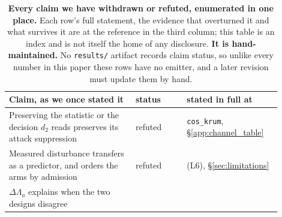 \documentclass{article}
\begin{document}
\begin{table}[t]
\caption{\textbf{Every claim we have withdrawn or refuted, enumerated in one place.} Each row's full
statement, the evidence that overturned it and what survives it are at the reference in the third
column; this table is an index and is not itself the home of any disclosure. \textbf{It is
hand-maintained.} No \texttt{results/} artifact records claim status, so unlike every number in this
paper these rows have no emitter, and a later revision must update them by hand.}
\label{tab:status}
\centering
\small
\begin{tabular}{@{}p{0.42\linewidth}p{0.17\linewidth}p{0.31\linewidth}@{}}
\toprule
Claim, as we once stated it & \raggedright status & stated in full at \\
\midrule
Preserving the statistic or the decision $d_2$ reads preserves its attack suppression &
\raggedright refuted & \texttt{cos\_krum}, §\ref{app:channel_table} \\
Measured disturbance transfers as a predictor, and orders the arms by admission &
\raggedright refuted & (L6), §\ref{sec:limitations} \\
$\Delta\Lambda_a$ explains when the two designs disagree &

\end{tabular}
\end{table}
\end{document}
